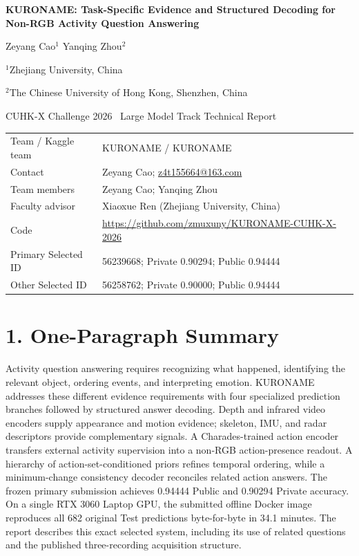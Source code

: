 \documentclass[12pt,a4paper]{article}
\begin{document}
\thispagestyle{empty}
\begin{center}
{\color{ink}\LARGE\bfseries KURONAME: Task-Specific Evidence and Structured Decoding for Non-RGB Activity Question Answering\par}
\vspace{9pt}
{\large Zeyang Cao$^1$ \quad Yanqing Zhou$^2$}\par
$^1$Zhejiang University, China\par
$^2$The Chinese University of Hong Kong, Shenzhen, China\par
CUHK-X Challenge 2026 \textbar\ Large Model Track Technical Report
\end{center}
\vspace{4pt}
\begin{tabularx}{\linewidth}{@{}L{36mm}Y@{}}
\toprule
Team / Kaggle team & KURONAME / KURONAME\\
Contact & Zeyang Cao; \href{mailto:z4t155664@163.com}{z4t155664@163.com}\\
Team members & Zeyang Cao; Yanqing Zhou\\
Faculty advisor & Xiaoxue Ren (Zhejiang University, China)\\
Code & \url{https://github.com/zmuxuny/KURONAME-CUHK-X-2026}\\
Primary Selected ID & 56239668; Private 0.90294; Public 0.94444\\
Other Selected ID & 56258762; Private 0.90000; Public 0.94444\\
\bottomrule
\end{tabularx}

\section*{1. One-Paragraph Summary}
Activity question answering requires recognizing what happened, identifying the relevant object, ordering events, and interpreting emotion. KURONAME addresses these different evidence requirements with four specialized prediction branches followed by structured answer decoding. Depth and infrared video encoders supply appearance and motion evidence; skeleton, IMU, and radar descriptors provide complementary signals. A Charades-trained action encoder transfers external activity supervision into a non-RGB action-presence readout. A hierarchy of action-set-conditioned priors refines temporal ordering, while a minimum-change consistency decoder reconciles related action answers. The frozen primary submission achieves 0.94444 Public and 0.90294 Private accuracy. On a single RTX 3060 Laptop GPU, the submitted offline Docker image reproduces all 682 original Test predictions byte-for-byte in 34.1 minutes. The report describes this exact selected system, including its use of related questions and the published three-recording acquisition structure.
\end{document}
